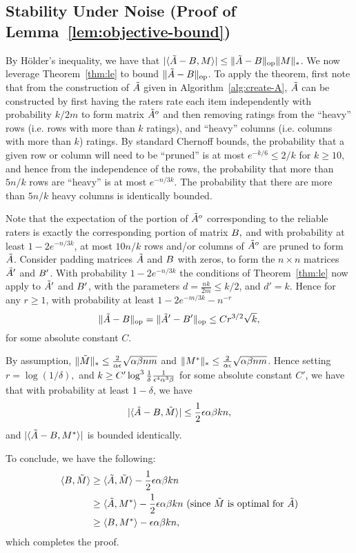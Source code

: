 \subsection{Stability Under Noise (Proof of Lemma~\ref{lem:objective-bound})}
\label{sec:objective-bound-proof}

By H\"{o}lder's inequality, we have that $|\langle \tilde{A}-B, M \rangle| \leq \|\tilde{A}-B\|_{\mathrm{op}}\|M\|_*$.   We now leverage Theorem~\ref{thm:le} to bound $\|\tilde{A}-B\|_{\mathrm{op}}$.  To apply the theorem, first note that from the construction of $\tilde{A}$ given in Algorithm~\ref{alg:create-A}, $\tilde{A}$ can be constructed by first having the raters rate each item independently with probability $k/2m$ to form matrix $\tilde{A}^o$ and then removing ratings from the ``heavy'' rows (i.e. rows with more than $k$ ratings), and ``heavy'' columns (i.e. columns with more than $k$) ratings.  By standard Chernoff bounds, the probability that a given row or column will need to be ``pruned'' is at most $e^{-k/6} \le 2/k$ for $k\ge 10$, and hence from the independence of the rows, the probability that more than $5n/k$ rows are ``heavy'' is at most $e^{-n/3k}$.  The probability that there are more than $5n/k$ heavy columns is identically bounded.

 Note that the expectation of the portion of $\tilde{A}^o$ corresponding to the reliable raters is exactly the corresponding portion of matrix $B,$ and with probability at least $1-2e^{-n/3k}$, at most $10 n/k$ rows and/or columns of $\tilde{A}^o$ are pruned to form $\tilde{A}$.  Consider padding matrices $\tilde{A}$ and $B$ with zeros, to form the $n \times n$ matrices $\tilde{A}'$ and $B'$.   With probability $1-2e^{-n/3k}$ the conditions of Theorem~\ref{thm:le} now apply to $\tilde{A}'$ and $B'$, with the parameters $d = \frac{n k}{2m} \le k/2$, and $d' =  k$.  Hence for any $r \ge 1$, with probability at least $1-2e^{-m/3k} -n^{-r}$ $$\|\tilde{A}-B\|_{\mathrm{op}} = \|\tilde{A}'-B'\|_{\mathrm{op}} \le C r^{3/2} \sqrt{k},$$ for some absolute constant $C$.  

By assumption, $\|\tilde{M}\|_* \le \frac{2}{\alpha \epsilon}\sqrt{\alpha \beta n m}$ and $\|M^*\|_* \le \frac{2}{\alpha \epsilon}\sqrt{\alpha \beta n m}$.   Hence setting $r= \log (1/\delta),$ and $k \ge C' \log^3 \frac{1}{\delta} \frac{1}{\epsilon^4 \alpha^3 \beta}$ for some absolute constant $C'$, we have that with probability at least $1-\delta$, we have $$|\langle \tilde{A}-B, \tilde{M} \rangle|  \le \frac{1}{2} \epsilon \alpha \beta k n,$$ and $|\langle \tilde{A}-B, M^* \rangle|$ is bounded identically.

To conclude, we have the following:
\begin{align}
\langle B, \tilde{M} \rangle  &\geq \langle \tilde{A}, \tilde{M} \rangle - \frac{1}{2}\epsilon \alpha \beta k n \\
 &\geq \langle \tilde{A}, M^* \rangle - \frac{1}{2} \epsilon \alpha \beta k n \text{ (since $\tilde{M}$ is optimal for $\tilde{A}$)} \\
 &\geq \langle B, M^* \rangle - \epsilon \alpha \beta k n,
\end{align}
which completes the proof.


